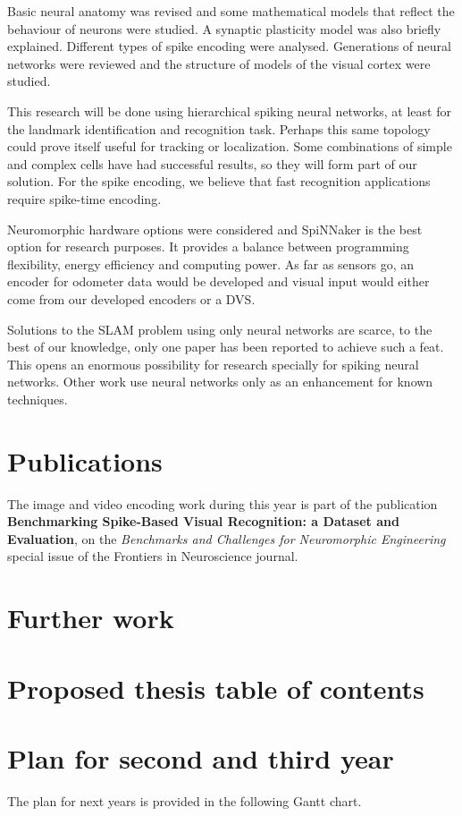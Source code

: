 Basic neural anatomy was revised and some mathematical models that reflect the behaviour of neurons were studied. A synaptic plasticity model was also briefly explained. Different types of spike encoding were analysed. Generations of neural networks were reviewed and the structure of models of the visual cortex were studied. 

This research will be done using hierarchical spiking neural networks, at least for the landmark identification and recognition task. Perhaps this same topology could prove itself useful for tracking or localization. Some combinations of simple and complex cells have had successful results, so they will form part of our solution. For the spike encoding, we believe that fast recognition applications require spike-time encoding.

Neuromorphic hardware options were considered and SpiNNaker is the best option for research purposes. It provides a balance between programming flexibility, energy efficiency and computing power. As far as sensors go, an encoder for odometer data would be developed and visual input would either come from our developed encoders or a DVS.

Solutions to the SLAM problem using only neural networks are scarce, to the best of our knowledge, only one paper has been reported to achieve such a feat. This opens an enormous possibility for research specially for spiking neural networks. Other work use neural networks only as an enhancement for known techniques.

\section{Publications}
The image and video encoding work during this year is part of the publication \textbf{Benchmarking Spike-Based Visual Recognition: a Dataset and Evaluation}, on the \emph{Benchmarks and Challenges for Neuromorphic Engineering} special issue of the Frontiers in Neuroscience journal.

\section{Further work}


\section{Proposed thesis table of contents}


\section{Plan for second and third year}
%
The plan for next years is provided in the following Gantt chart.
\newpage

